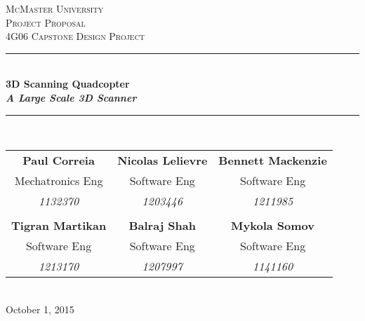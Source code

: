 \documentclass[10pt,letterpaper]{article}
\begin{document}
	
	
	\begin{titlepage}
		\newcommand{\HRule}{\rule{\linewidth}{0.5mm}}
		\center
		
		\textsc{\LARGE McMaster University}\\[1.5cm] %
		\textsc{\Large Project Proposal}\\[0.5cm] %
		\textsc{\large 4G06 Capstone Design Project}\\[0.5cm] %
		
		\HRule \\[0.4cm]
		{ \huge \bfseries 3D Scanning Quadcopter \\[2mm] \textit{A Large Scale 3D Scanner}}\\[0.4cm] %
		\HRule \\[1.5cm]
		
		\begin{tabular}{ccc}
			\bf{Paul Correia}		& \bf{Nicolas Lelievre} 	& \bf{Bennett Mackenzie}		\\
			Mechatronics Eng 		& Software Eng 				& Software Eng 					\\
			\textit{1132370} 		& \textit{1203446}			& \textit{1211985} 				\\ \\
			\bf{Tigran Martikan} 	& \bf{Balraj Shah} 			& \bf{Mykola Somov} 			\\
			Software Eng			& Software Eng				& Software Eng 					\\
			\textit{1213170} 		& \textit{1207997}			& \textit{1141160}
		\end{tabular}\\[4cm]
		
		{\large October 1, 2015}\\[3cm] 
		
		
		\vfill %
		
	\end{titlepage}
	
\end{document}
